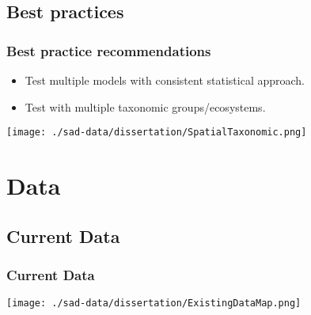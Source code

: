 \documentclass[14pt]{beamer}
\begin{document}
\subsection{Best practices}
\begin{frame}[t]
\frametitle{Best practice recommendations}
\begin{itemize}
\item Test multiple models with consistent statistical approach.
\item Test with multiple taxonomic groups/ecosystems.  
\end{itemize}
\vspace{-7pt}
\begin{center}
\texttt{[image: ./sad-data/dissertation/SpatialTaxonomic.png]}
\end{center}
\end{frame}




\section{Data}
\subsection{Current Data}
\begin{frame}[t]
\frametitle{Current Data}
\vspace{-7pt}
\begin{center}
\texttt{[image: ./sad-data/dissertation/ExistingDataMap.png]}
\end{center}
\end{frame}
\end{document}
